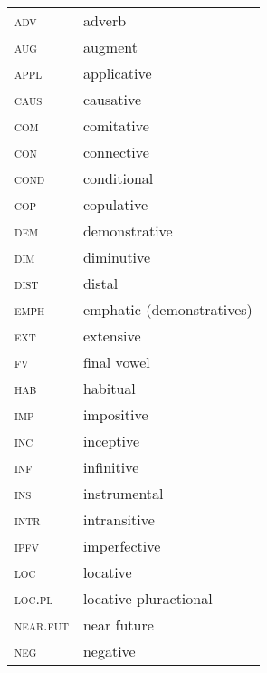 \addchap{\lsAbbreviationsTitle}


\begin{tabularx}{.5\textwidth}{@{}lQ}
\textsc{adv} & adverb\\
\textsc{aug} & augment\\
\textsc{appl} & applicative\\
\textsc{caus} & causative\\
\textsc{com} & comitative\\
\textsc{con} & connective\\
\textsc{cond} & conditional\\
\textsc{cop} & copulative\\
\textsc{dem} & demonstrative\\
\textsc{dim} & diminutive\\
\textsc{dist} & distal\\
\textsc{emph} & emphatic (demonstratives)\\
\textsc{ext} & extensive\\
\textsc{fv} & final vowel\\
\textsc{hab} & habitual\\
\textsc{imp} & impositive\\
\textsc{inc} & inceptive\\
\textsc{inf} & infinitive\\
\textsc{ins} & instrumental\\
\textsc{intr} & intransitive\\
\textsc{ipfv} & imperfective\\
\textsc{loc} & locative\\
\textsc{loc}.\textsc{pl} & locative pluractional\\
\textsc{near}.\textsc{fut} & near future\\
\textsc{neg} & negative\\
\end{tabularx}%
